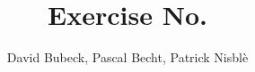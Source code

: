 \documentclass[11pt, a4paper, reqno]{scrartcl}
\begin{document}
    \title{Exercise No. }
    \author{David Bubeck, Pascal Becht, Patrick Nisbl\`e}
    \maketitle
    
    \lstset{
        language=Python
    }
\end{document}
